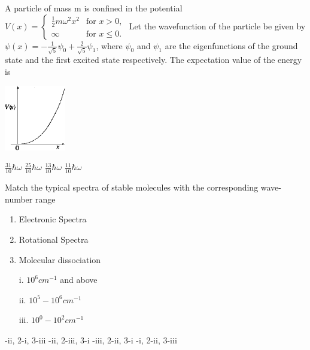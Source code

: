 \documentclass{exam}
\begin{document}
\begin{questions}
\question A particle of mass m is confined in the potential $V(x)=\begin{cases} \frac{1}{2}m\omega^{2}x^{2} & \text{for } x>0, \\ \infty & \text{for } x \le 0. \end{cases}$
	Let the wavefunction of the particle be given by $\psi(x)=-\frac{1}{\sqrt{5}}\psi_{0}+\frac{2}{\sqrt{5}}\psi_{1}$, where $\psi_0$ and $\psi_1$ are the eigenfunctions of the ground state and the first excited state respectively. The expectation value of the energy is\hfill{}
	\begin{center}
		\includegraphics[width=0.2\textwidth]{pics/35.png}
	\end{center}


\begin{oneparchoices}
	\choice $\frac{31}{10}\hbar\omega$ \choice $\frac{25}{10}\hbar\omega$ \choice $\frac{13}{10}\hbar\omega$ \choice $\frac{11}{10}\hbar\omega$
\end{oneparchoices}

\question Match the typical spectra of stable molecules with the corresponding wave-number range\hfill{}

\begin{multicols}{2}
 \begin{enumerate}
  \item Electronic Spectra
  \item Rotational Spectra
  \item Molecular dissociation
 \end{enumerate}
\columnbreak
\begin{itemize}
 \item [i.] $10^6 cm^{-1}$ and above
 \item [ii.] $10^5 - 10^6 cm^{-1}$
 \item [iii.] $10^0 - 10^2 cm^{-1}$
\end{itemize}


\end{multicols}


\begin{choices}
	\begin{multicols}{2}
	 -ii, 2-i, 3-iii -ii, 2-iii, 3-i -iii, 2-ii, 3-i -i, 2-ii, 3-iii
	\end{multicols}
\end{choices}


\end{questions}
\end{document}
